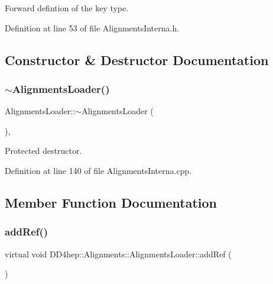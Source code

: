 Forward defintion of the key type. 



Definition at line 53 of file Alignments\+Interna.\+h.



\subsection{Constructor \& Destructor Documentation}
\hypertarget{class_d_d4hep_1_1_alignments_1_1_alignments_loader_af2ad650d826e5656254929ae956ee2ef}{}\label{class_d_d4hep_1_1_alignments_1_1_alignments_loader_af2ad650d826e5656254929ae956ee2ef} 
\subsubsection{\texorpdfstring{$\sim$\+Alignments\+Loader()}{~AlignmentsLoader()}}
{\footnotesize\ttfamily Alignments\+Loader\+::$\sim$\+Alignments\+Loader (\begin{DoxyParamCaption}{ }\end{DoxyParamCaption})\hspace{0.3cm}{\ttfamily [protected]}, {\ttfamily [virtual]}}



Protected destructor. 



Definition at line 140 of file Alignments\+Interna.\+cpp.



\subsection{Member Function Documentation}
\hypertarget{class_d_d4hep_1_1_alignments_1_1_alignments_loader_a47a4586ac933395c27b705939985f41f}{}\label{class_d_d4hep_1_1_alignments_1_1_alignments_loader_a47a4586ac933395c27b705939985f41f} 
\subsubsection{\texorpdfstring{add\+Ref()}{addRef()}}
{\footnotesize\ttfamily virtual void D\+D4hep\+::\+Alignments\+::\+Alignments\+Loader\+::add\+Ref (\begin{DoxyParamCaption}{ }\end{DoxyParamCaption})\hspace{0.3cm}{\ttfamily [pure virtual]}}



